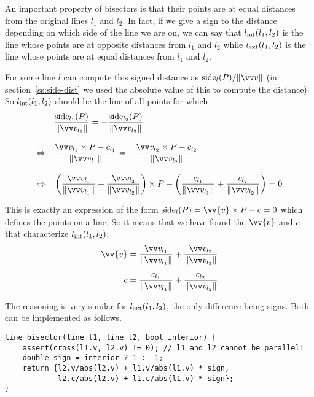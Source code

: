 

An important property of bisectors is that their points are at equal distances from the original lines $l_1$ and $l_2$. In fact, if we give a sign to the distance depending on which side of the line we are on, we can say that ${l_\mathrm{int}(l_1,l_2)}$ is the line whose points are at opposite distances from $l_1$ and $l_2$ while ${l_\mathrm{ext}(l_1,l_2)}$ is the line whose points are at equal distances from $l_1$ and $l_2$.

For some line $l$ can compute this signed distance as $\side_l(P)/\normv{v}$ (in section~\ref{ss:side-dist} we used the absolute value of this to compute the distance). So ${l_\mathrm{int}(l_1,l_2)}$ should be the line of all points for which
\begin{align*}
&\frac{\side_{l_1}(P)}{\norm{\dirof{l_1}}} = -\frac{\side_{l_2}(P)}{\norm{\dirof{l_2}}}\\[.3cm]
\Leftrightarrow\quad &\frac{\dirof{l_1}\times P - c_{l_1}}{\norm{\dirof{l_1}}} = - \frac{\dirof{l_2}\times P - c_{l_2}}{\norm{\dirof{l_2}}}\\[.3cm]
\Leftrightarrow\quad &\left(\frac{\dirof{l_1}}{\norm{\dirof{l_1}}} + \frac{\dirof{l_2}}{\norm{\dirof{l_2}}}\right) \times P
- \left(\frac{c_{l_1}}{\norm{\dirof{l_1}}} + \frac{c_{l_2}}{\norm{\dirof{l_2}}}\right) = 0
\end{align*}

This is exactly an expression of the form $\side_l(P) = \vv{v} \times P - c = 0$ which defines the points on a line. So it means that we have found the $\vv{v}$ and $c$ that characterize ${l_\mathrm{int}(l_1,l_2)}$:
\begin{align*}
\vv{v} &= \frac{\dirof{l_1}}{\norm{\dirof{l_1}}} + \frac{\dirof{l_2}}{\norm{\dirof{l_2}}}\\[.2cm]
c &= \frac{c_{l_1}}{\norm{\dirof{l_1}}} + \frac{c_{l_2}}{\norm{\dirof{l_2}}}
\end{align*}

The reasoning is very similar for ${l_\mathrm{ext}(l_1,l_2)}$, the only difference being signs. Both can be implemented as follows.
\begin{lstlisting}
line bisector(line l1, line l2, bool interior) {
    assert(cross(l1.v, l2.v) != 0); // l1 and l2 cannot be parallel!
    double sign = interior ? 1 : -1;
    return {l2.v/abs(l2.v) + l1.v/abs(l1.v) * sign,
            l2.c/abs(l2.v) + l1.c/abs(l1.v) * sign};
}
\end{lstlisting}
